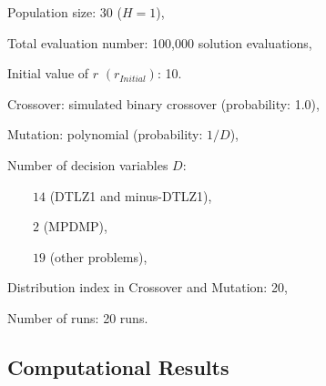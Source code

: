 \documentclass[conference]{IEEEtran}
\begin{document}
Population size: 30 ($H=1$), 

Total evaluation number: 100,000 solution evaluations,

Initial value of $r$ $(r_{Initial})$: 10.

Crossover: simulated binary crossover (probability: 1.0),

Mutation: polynomial (probability: $1/D$),

Number of decision variables $D$:

$\qquad 14$ (DTLZ1 and minus-DTLZ1),

$\qquad 2$ (MPDMP),

$\qquad 19$ (other problems),

Distribution index in Crossover and Mutation: 20, 

Number of runs: 20 runs.

% 
\subsection{Computational Results}
\end{document}
